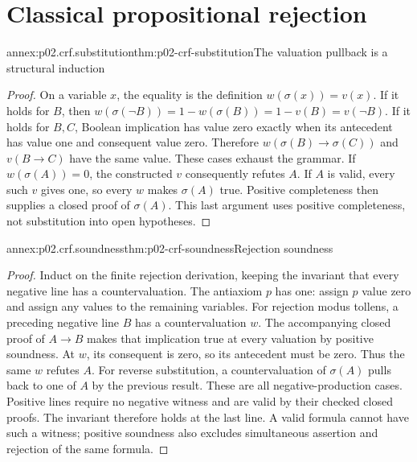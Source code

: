 \section{Classical propositional rejection}
\label{annex:p02-classical-rejection}

\begin{annexitem}{annex:p02.crf.substitution}{thm:p02-crf-substitution}{The valuation pullback is a structural induction}
\begin{proof}
On a variable \(x\), the equality is the definition
\(w(\sigma(x))=v(x)\). If it holds for \(B\), then
\(w(\sigma(\neg B))=1-w(\sigma(B))=1-v(B)=v(\neg B)\).
If it holds for \(B,C\), Boolean implication has value zero exactly
when its antecedent has value one and consequent value zero.
Therefore \(w(\sigma(B)\to\sigma(C))\) and \(v(B\to C)\)
have the same value. These cases exhaust the grammar.
If \(w(\sigma(A))=0\), the constructed \(v\) consequently
refutes \(A\). If \(A\) is valid, every such \(v\) gives one,
so every \(w\) makes \(\sigma(A)\) true. Positive completeness
then supplies a closed proof of \(\sigma(A)\). This last argument
uses positive completeness, not substitution into open hypotheses.
\end{proof}
\end{annexitem}

\begin{annexitem}{annex:p02.crf.soundness}{thm:p02-crf-soundness}{Rejection soundness}
\begin{proof}
Induct on the finite rejection derivation, keeping the invariant that
every negative line has a countervaluation. The antiaxiom \(p\)
has one: assign \(p\) value zero and assign any values to the
remaining variables.
For rejection modus tollens, a preceding negative line \(B\) has
a countervaluation \(w\). The accompanying closed proof of
\(A\to B\) makes that implication true at every valuation by
positive soundness. At \(w\), its consequent is zero, so its
antecedent must be zero. Thus the same \(w\) refutes \(A\).
For reverse substitution, a countervaluation of \(\sigma(A)\)
pulls back to one of \(A\) by the previous result. These are all
negative-production cases. Positive lines require no negative witness
and are valid by their checked closed proofs. The invariant therefore
holds at the last line. A valid formula cannot have such a witness;
positive soundness also excludes simultaneous assertion and rejection
of the same formula.
\end{proof}
\end{annexitem}

